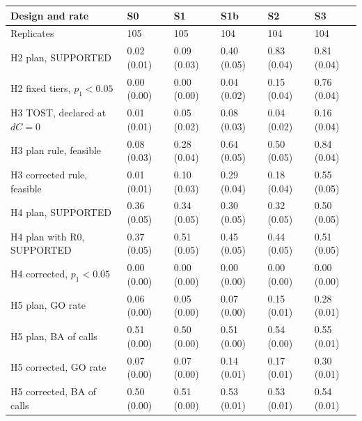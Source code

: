 \begin{tabular}{@{}l lllll@{}}
\toprule
Design and rate & S0 & S1 & S1b & S2 & S3 \\
\midrule
Replicates & 105 & 105 & 104 & 104 & 104 \\
H2 plan, SUPPORTED & 0.02 (0.01) & 0.09 (0.03) & 0.40 (0.05) & 0.83 (0.04) & 0.81 (0.04) \\
H2 fixed tiers, $p_1<0.05$ & 0.00 (0.00) & 0.00 (0.00) & 0.04 (0.02) & 0.15 (0.04) & 0.76 (0.04) \\
H3 TOST, declared at $dC=0$ & 0.01 (0.01) & 0.05 (0.02) & 0.08 (0.03) & 0.04 (0.02) & 0.16 (0.04) \\
H3 plan rule, feasible & 0.08 (0.03) & 0.28 (0.04) & 0.64 (0.05) & 0.50 (0.05) & 0.84 (0.04) \\
H3 corrected rule, feasible & 0.01 (0.01) & 0.10 (0.03) & 0.29 (0.04) & 0.18 (0.04) & 0.55 (0.05) \\
H4 plan, SUPPORTED & 0.36 (0.05) & 0.34 (0.05) & 0.30 (0.05) & 0.32 (0.05) & 0.50 (0.05) \\
H4 plan with R0, SUPPORTED & 0.37 (0.05) & 0.51 (0.05) & 0.45 (0.05) & 0.44 (0.05) & 0.51 (0.05) \\
H4 corrected, $p_1<0.05$ & 0.00 (0.00) & 0.00 (0.00) & 0.00 (0.00) & 0.00 (0.00) & 0.00 (0.00) \\
H5 plan, GO rate & 0.06 (0.00) & 0.05 (0.00) & 0.07 (0.00) & 0.15 (0.01) & 0.28 (0.01) \\
H5 plan, BA of calls & 0.51 (0.00) & 0.50 (0.00) & 0.51 (0.00) & 0.54 (0.00) & 0.55 (0.01) \\
H5 corrected, GO rate & 0.07 (0.00) & 0.07 (0.00) & 0.14 (0.01) & 0.17 (0.01) & 0.30 (0.01) \\
H5 corrected, BA of calls & 0.50 (0.00) & 0.51 (0.00) & 0.53 (0.01) & 0.53 (0.01) & 0.54 (0.01) \\
\bottomrule
\end{tabular}
